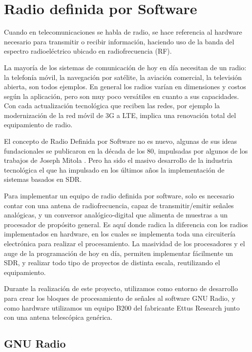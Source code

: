 \chapter{Radio definida por Software}

Cuando en telecomunicaciones se habla de radio, se hace referencia al hardware necesario para transmitir o recibir información, haciendo uso de la banda del espectro radioeléctrico ubicado en radiofrecuencia (RF).

La mayoría de los sistemas de comunicación de hoy en día necesitan de un radio: la telefonía móvil,  la navegación por satélite, la aviación comercial, la televisión abierta, son todos ejemplos. En general los radios varían en dimensiones y costos según la aplicación, pero son muy poco versátiles en cuanto a sus capacidades. Con cada actualización tecnológica que reciben las redes, por ejemplo la modernización de la red móvil de 3G a LTE, implica una renovación total del equipamiento de radio. 

El concepto de Radio Definida por Software no es nuevo, algunas de sus ideas fundacionales se publicaron en la década de los 80, impulsadas por algunos de los trabajos de Joseph Mitola \cite{mitola_SDR}. Pero ha sido el masivo desarrollo de la industria tecnológica el que ha impulsado en los últimos años la implementación de sistemas basados en SDR. 

Para implementar un equipo de radio definida por software, solo es necesario contar con una antena de radiofrecuencia, capaz de transmitir/emitir señales analógicas, y un conversor analógico-digital que alimenta de muestras a un procesador de propósito general. Es aquí donde radica la diferencia con los radios implementados en hardware, en los cuales se implementa toda una circuitería electrónica para realizar el procesamiento. La masividad de los procesadores y el auge de la programación de hoy en día, permiten implementar fácilmente un SDR, y realizar todo tipo de proyectos de distinta escala, reutilizando el equipamiento. 

Durante la realización de este proyecto, utilizamos como entorno de desarrollo para crear los bloques de procesamiento de señales al software GNU Radio\cite{GNURadio}, y como hardware utilizamos un equipo B200 del fabricante Ettus Research\cite{EttusResearch} junto con una antena telescópica genérica. 

\section{GNU Radio}

